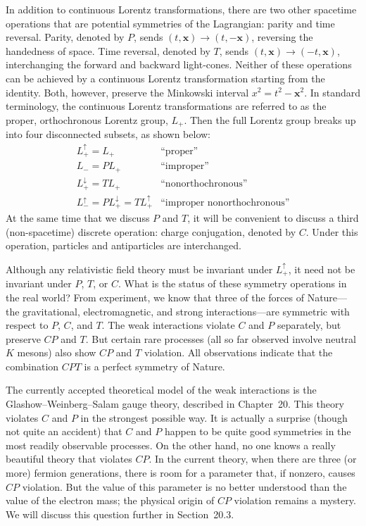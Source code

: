 In addition to continuous Lorentz transformations, there are two other
spacetime operations that are potential symmetries of the Lagrangian: parity
and time reversal.  Parity, denoted by $P$, sends $(t,\mathbf{x})\to(t,-\mathbf{x})$,
reversing the handedness of space.  Time reversal, denoted by $T$, sends
$(t,\mathbf{x})\to(-t,\mathbf{x})$, interchanging the forward and backward
light-cones.  Neither of these operations can be achieved by a continuous
Lorentz transformation starting from the identity.  Both, however, preserve
the Minkowski interval $x^2 = t^2 - \mathbf{x}^2$.  In standard terminology,
the continuous Lorentz transformations are referred to as the proper,
orthochronous Lorentz group, $L_+$.  Then the full Lorentz group breaks up
into four disconnected subsets, as shown below:
\begin{equation}
  \begin{array}{ll}
    L_+^\uparrow = L_+ & \text{``proper''}\\
    L_- = PL_+ & \text{``improper''}\\
    L_+^\downarrow = TL_+ & \text{``nonorthochronous''}\\
    L_-^\uparrow = PL_+^\downarrow = TL_+^\uparrow &
      \text{``improper nonorthochronous''}
  \end{array}
\end{equation}
At the same time that we discuss $P$ and $T$, it will be convenient to
discuss a third (non-spacetime) discrete operation: charge conjugation,
denoted by $C$.  Under this operation, particles and antiparticles are
interchanged.

Although any relativistic field theory must be invariant under $L_+^\uparrow$,
it need not be invariant under $P$, $T$, or $C$.  What is the status of these
symmetry operations in the real world?  From experiment, we know that three
of the forces of Nature---the gravitational, electromagnetic, and strong
interactions---are symmetric with respect to $P$, $C$, and $T$.  The weak
interactions violate $C$ and $P$ separately, but preserve $CP$ and $T$.  But
certain rare processes (all so far observed involve neutral $K$ mesons) also
show $CP$ and $T$ violation.  All observations indicate that the combination
$CPT$ is a perfect symmetry of Nature.

The currently accepted theoretical model of the weak interactions is the
Glashow--Weinberg--Salam gauge theory, described in Chapter~20.  This theory
violates $C$ and $P$ in the strongest possible way.  It is actually a surprise
(though not quite an accident) that $C$ and $P$ happen to be quite good
symmetries in the most readily observable processes.  On the other hand, no
one knows a really beautiful theory that violates $CP$.  In the current
theory, when there are three (or more) fermion generations, there is room for
a parameter that, if nonzero, causes $CP$ violation.  But the value of this
parameter is no better understood than the value of the electron mass; the
physical origin of $CP$ violation remains a mystery.  We will discuss this
question further in Section~20.3.

